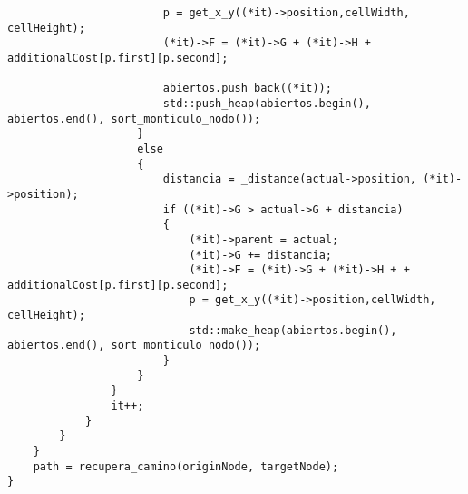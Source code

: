 \begin{lstlisting}
                        p = get_x_y((*it)->position,cellWidth, cellHeight);
                        (*it)->F = (*it)->G + (*it)->H + additionalCost[p.first][p.second];
                        
                        abiertos.push_back((*it));
                        std::push_heap(abiertos.begin(), abiertos.end(), sort_monticulo_nodo());
                    }
                    else
                    {
                        distancia = _distance(actual->position, (*it)->position);
                        if ((*it)->G > actual->G + distancia)
                        {
                            (*it)->parent = actual;
                            (*it)->G += distancia;
                            (*it)->F = (*it)->G + (*it)->H + + additionalCost[p.first][p.second];
                            p = get_x_y((*it)->position,cellWidth, cellHeight);
                            std::make_heap(abiertos.begin(), abiertos.end(), sort_monticulo_nodo());
                        }
                    }
                }
                it++;
            }
        }
    }
    path = recupera_camino(originNode, targetNode);
}

\end{lstlisting}
